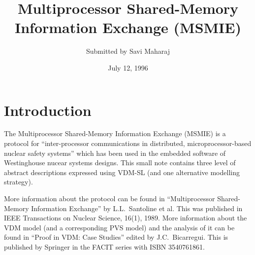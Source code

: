 \documentclass{article}
\begin{document}
\title{Multiprocessor Shared-Memory Information Exchange (MSMIE)}
\author{Submitted by Savi Maharaj}
\date{July 12, 1996}
\maketitle

\section{Introduction}

The Multiprocessor Shared-Memory Information Exchange (MSMIE) is a
protocol for ``inter-processor communications in distributed,
microprocessor-based nuclear safety systems'' which has been used in
the embedded software of Westinghouse nucear systems designs.
This small note contains three level of abstract descriptions
expressed using VDM-SL (and one alternative modelling strategy). 

More information about the protocol can be found in ``Multiprocessor
Shared-Memory Information Exchange'' by L.L.\ Santoline et al. This
was published in IEEE Transactions on Nuclear Science, 16(1),
1989. More information about the VDM model (and a corresponding PVS
model) and the analysis of it can be found in ``Proof in VDM: Case
Studies'' edited by J.C.\ Bicarregui. This is published by Springer in
the FACIT series with ISBN 3540761861.










\printindex
\end{document}
